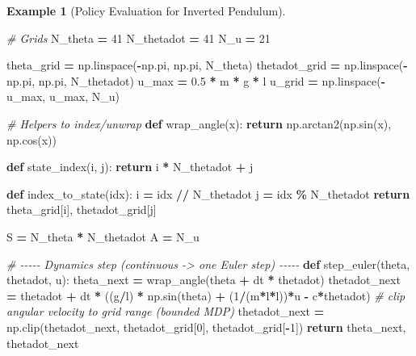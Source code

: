 \documentclass[
]{book}
\newenvironment{Shaded}{\begin{snugshade}}{\end{snugshade}}
\newcommand{\CommentTok}[1]{\textcolor[rgb]{0.56,0.35,0.01}{\textit{#1}}}
\newcommand{\ControlFlowTok}[1]{\textcolor[rgb]{0.13,0.29,0.53}{\textbf{#1}}}
\newcommand{\DecValTok}[1]{\textcolor[rgb]{0.00,0.00,0.81}{#1}}
\newcommand{\FloatTok}[1]{\textcolor[rgb]{0.00,0.00,0.81}{#1}}
\newcommand{\KeywordTok}[1]{\textcolor[rgb]{0.13,0.29,0.53}{\textbf{#1}}}
\newcommand{\NormalTok}[1]{#1}
\newcommand{\OperatorTok}[1]{\textcolor[rgb]{0.81,0.36,0.00}{\textbf{#1}}}
\theoremstyle{definition}
\theoremstyle{definition}
\newtheorem{example}{Example}[chapter]
\theoremstyle{definition}
\theoremstyle{definition}
\theoremstyle{remark}
\begin{document}
\begin{example}[Policy Evaluation for Inverted Pendulum]
\begin{Shaded}
\begin{Highlighting}[]
\CommentTok{\# Grids}
\NormalTok{N\_theta }\OperatorTok{=} \DecValTok{41}
\NormalTok{N\_thetadot }\OperatorTok{=} \DecValTok{41}
\NormalTok{N\_u }\OperatorTok{=} \DecValTok{21}

\NormalTok{theta\_grid }\OperatorTok{=}\NormalTok{ np.linspace(}\OperatorTok{{-}}\NormalTok{np.pi, np.pi, N\_theta)}
\NormalTok{thetadot\_grid }\OperatorTok{=}\NormalTok{ np.linspace(}\OperatorTok{{-}}\NormalTok{np.pi, np.pi, N\_thetadot)}
\NormalTok{u\_max }\OperatorTok{=} \FloatTok{0.5} \OperatorTok{*}\NormalTok{ m }\OperatorTok{*}\NormalTok{ g }\OperatorTok{*}\NormalTok{ l}
\NormalTok{u\_grid }\OperatorTok{=}\NormalTok{ np.linspace(}\OperatorTok{{-}}\NormalTok{u\_max, u\_max, N\_u)}

\CommentTok{\# Helpers to index/unwrap}
\KeywordTok{def}\NormalTok{ wrap\_angle(x):}
    \ControlFlowTok{return}\NormalTok{ np.arctan2(np.sin(x), np.cos(x))}

\KeywordTok{def}\NormalTok{ state\_index(i, j):}
    \ControlFlowTok{return}\NormalTok{ i }\OperatorTok{*}\NormalTok{ N\_thetadot }\OperatorTok{+}\NormalTok{ j}

\KeywordTok{def}\NormalTok{ index\_to\_state(idx):}
\NormalTok{    i }\OperatorTok{=}\NormalTok{ idx }\OperatorTok{//}\NormalTok{ N\_thetadot}
\NormalTok{    j }\OperatorTok{=}\NormalTok{ idx }\OperatorTok{\%}\NormalTok{ N\_thetadot}
    \ControlFlowTok{return}\NormalTok{ theta\_grid[i], thetadot\_grid[j]}

\NormalTok{S }\OperatorTok{=}\NormalTok{ N\_theta }\OperatorTok{*}\NormalTok{ N\_thetadot}
\NormalTok{A }\OperatorTok{=}\NormalTok{ N\_u}

\CommentTok{\# {-}{-}{-}{-}{-} Dynamics step (continuous {-}\textgreater{} one Euler step) {-}{-}{-}{-}{-}}
\KeywordTok{def}\NormalTok{ step\_euler(theta, thetadot, u):}
\NormalTok{    theta\_next }\OperatorTok{=}\NormalTok{ wrap\_angle(theta }\OperatorTok{+}\NormalTok{ dt }\OperatorTok{*}\NormalTok{ thetadot)}
\NormalTok{    thetadot\_next }\OperatorTok{=}\NormalTok{ thetadot }\OperatorTok{+}\NormalTok{ dt }\OperatorTok{*}\NormalTok{ ((g}\OperatorTok{/}\NormalTok{l) }\OperatorTok{*}\NormalTok{ np.sin(theta) }\OperatorTok{+}\NormalTok{ (}\DecValTok{1}\OperatorTok{/}\NormalTok{(m}\OperatorTok{*}\NormalTok{l}\OperatorTok{*}\NormalTok{l))}\OperatorTok{*}\NormalTok{u }\OperatorTok{{-}}\NormalTok{ c}\OperatorTok{*}\NormalTok{thetadot)}
    \CommentTok{\# clip angular velocity to grid range (bounded MDP)}
\NormalTok{    thetadot\_next }\OperatorTok{=}\NormalTok{ np.clip(thetadot\_next, thetadot\_grid[}\DecValTok{0}\NormalTok{], thetadot\_grid[}\OperatorTok{{-}}\DecValTok{1}\NormalTok{])}
    \ControlFlowTok{return}\NormalTok{ theta\_next, thetadot\_next}


\end{Highlighting}
\end{Shaded}
\end{example}
\end{document}
